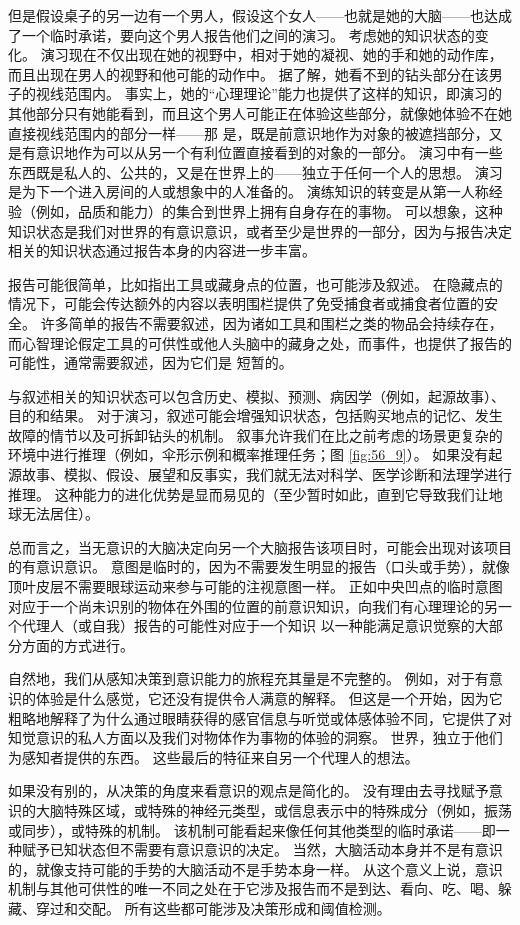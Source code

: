 但是假设桌子的另一边有一个男人，假设这个女人——也就是她的大脑——也达成了一个临时承诺，要向这个男人报告他们之间的演习。 考虑她的知识状态的变化。 演习现在不仅出现在她的视野中，相对于她的凝视、她的手和她的动作库，而且出现在男人的视野和他可能的动作中。 据了解，她看不到的钻头部分在该男子的视线范围内。 事实上，她的“心理理论”能力也提供了这样的知识，即演习的其他部分只有她能看到，而且这个男人可能正在体验这些部分，就像她体验不在她直接视线范围内的部分一样——那 是，既是前意识地作为对象的被遮挡部分，又是有意识地作为可以从另一个有利位置直接看到的对象的一部分。 演习中有一些东西既是私人的、公共的，又是在世界上的——独立于任何一个人的思想。 演习是为下一个进入房间的人或想象中的人准备的。 演练知识的转变是从第一人称经验（例如，品质和能力）的集合到世界上拥有自身存在的事物。 可以想象，这种知识状态是我们对世界的有意识意识，或者至少是世界的一部分，因为与报告决定相关的知识状态通过报告本身的内容进一步丰富。

报告可能很简单，比如指出工具或藏身点的位置，也可能涉及叙述。 在隐藏点的情况下，可能会传达额外的内容以表明围栏提供了免受捕食者或捕食者位置的安全。 许多简单的报告不需要叙述，因为诸如工具和围栏之类的物品会持续存在，而心智理论假定工具的可供性或他人头脑中的藏身之处，而事件，也提供了报告的可能性，通常需要叙述，因为它们是 短暂的。

与叙述相关的知识状态可以包含历史、模拟、预测、病因学（例如，起源故事）、目的和结果。 对于演习，叙述可能会增强知识状态，包括购买地点的记忆、发生故障的情节以及可拆卸钻头的机制。 叙事允许我们在比之前考虑的场景更复杂的环境中进行推理（例如，伞形示例和概率推理任务；图 \ref{fig:56_9}）。 如果没有起源故事、模拟、假设、展望和反事实，我们就无法对科学、医学诊断和法理学进行推理。 这种能力的进化优势是显而易见的（至少暂时如此，直到它导致我们让地球无法居住）。

总而言之，当无意识的大脑决定向另一个大脑报告该项目时，可能会出现对该项目的有意识意识。 意图是临时的，因为不需要发生明显的报告（口头或手势），就像顶叶皮层不需要眼球运动来参与可能的注视意图一样。 正如中央凹点的临时意图对应于一个尚未识别的物体在外围的位置的前意识知识，向我们有心理理论的另一个代理人（或自我）报告的可能性对应于一个知识 以一种能满足意识觉察的大部分方面的方式进行。

自然地，我们从感知决策到意识能力的旅程充其量是不完整的。 例如，对于有意识的体验是什么感觉，它还没有提供令人满意的解释。 但这是一个开始，因为它粗略地解释了为什么通过眼睛获得的感官信息与听觉或体感体验不同，它提供了对知觉意识的私人方面以及我们对物体作为事物的体验的洞察。 世界，独立于他们为感知者提供的东西。 这些最后的特征来自另一个代理人的想法。

如果没有别的，从决策的角度来看意识的观点是简化的。 没有理由去寻找赋予意识的大脑特殊区域，或特殊的神经元类型，或信息表示中的特殊成分（例如，振荡或同步），或特殊的机制。 该机制可能看起来像任何其他类型的临时承诺——即一种赋予已知状态但不需要有意识意识的决定。 当然，大脑活动本身并不是有意识的，就像支持可能的手势的大脑活动不是手势本身一样。 从这个意义上说，意识机制与其他可供性的唯一不同之处在于它涉及报告而不是到达、看向、吃、喝、躲藏、穿过和交配。 所有这些都可能涉及决策形成和阈值检测。

